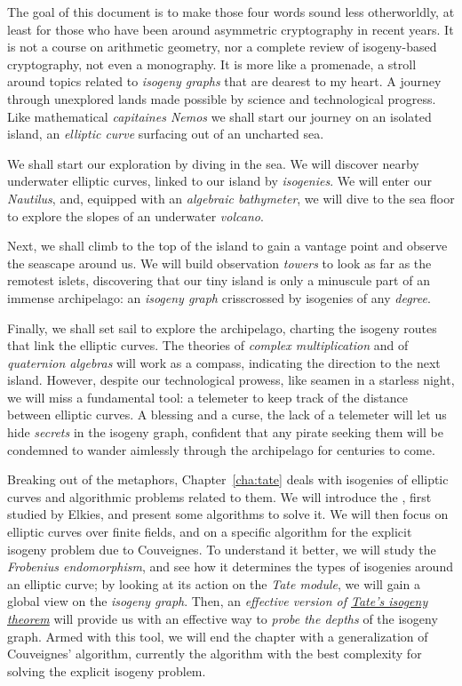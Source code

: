 \documentclass{report}
\theoremstyle{plain}
\theoremstyle{definition}
\begin{document}
The goal of this document is to make those four words sound less
otherworldly, at least for those who have been around asymmetric
cryptography in recent years. %
It is not a course on arithmetic geometry, nor a complete review of
isogeny-based cryptography, not even a monography. %
It is more like a promenade, a stroll around topics related to
\emph{isogeny graphs} that are dearest to my heart. %
A journey through unexplored lands made possible by science and
technological progress. %
Like mathematical \emph{capitaines Nemos} we shall start our journey
on an isolated island, an \emph{elliptic curve} surfacing out of an
uncharted sea. %

We shall start our exploration by diving in the sea. %
We will discover nearby underwater elliptic curves, linked to our
island by \emph{isogenies}. %
We will enter our \emph{Nautilus}, and, equipped with an
\emph{algebraic bathymeter}, we will dive to the sea floor to explore
the slopes of an underwater \emph{volcano}. %

Next, we shall climb to the top of the island to gain a vantage point
and observe the seascape around us. %
We will build observation \emph{towers} to look as far as the remotest
islets, discovering that our tiny island is only a minuscule part of
an immense archipelago: an \emph{isogeny graph} crisscrossed by
isogenies of any \emph{degree}.

Finally, we shall set sail to explore the archipelago, charting the
isogeny routes that link the elliptic curves. %
The theories of \emph{complex multiplication} and of \emph{quaternion
  algebras} will work as a compass, indicating the direction to the
next island. %
However, despite our technological prowess, like seamen in a starless
night, we will miss a fundamental tool: a telemeter to keep track of
the distance between elliptic curves. %
A blessing and a curse, the lack of a telemeter will let us hide
\emph{secrets} in the isogeny graph, confident that any pirate seeking
them will be condemned to wander aimlessly through the archipelago for
centuries to come.

Breaking out of the metaphors, Chapter~\ref{cha:tate} deals with
isogenies of elliptic curves and algorithmic problems related to
them. %
We will introduce the , first studied by
Elkies, and present some algorithms to solve it. %
We will then focus on elliptic curves over finite fields, and on a
specific algorithm for the explicit isogeny problem due to
Couveignes. %
To understand it better, we will study the \emph{Frobenius
  endomorphism}, and see how it determines the types of isogenies
around an elliptic curve; by looking at its action on the \emph{Tate
  module}, we will gain a global view on the \emph{isogeny graph}. %
Then, an \emph{effective version of \hyperref[th:tate]{Tate's isogeny
    theorem}} will provide us with an effective way to \emph{probe the
  depths} of the isogeny graph. %
Armed with this tool, we will end the chapter with a generalization of
Couveignes' algorithm, currently the algorithm with the best
complexity for solving the explicit isogeny problem. %
\end{document}
